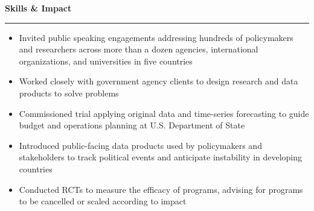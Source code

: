\documentclass[11pt]{article}
\begin{document}
\textbf{\large Skills \& Impact}\\
\rule[3mm]{\textwidth}{.2pt}
\vspace{-25pt}
\begin{itemize} \itemsep -5pt
  \item Invited public speaking engagements addressing hundreds of policymakers and researchers across more than a dozen agencies, international organizations, and universities in five countries
  \item Worked closely with government agency clients to design research and data products to solve problems
  \item Commissioned trial applying original data and time-series forecasting to guide budget and operations planning at U.S. Department of State
  \item Introduced public-facing data products used by policymakers and stakeholders to track political events and anticipate instability in developing countries
  \item Conducted RCTs to measure the efficacy of programs, advising for programs to be cancelled or scaled according to impact

\end{itemize}



\end{document}
